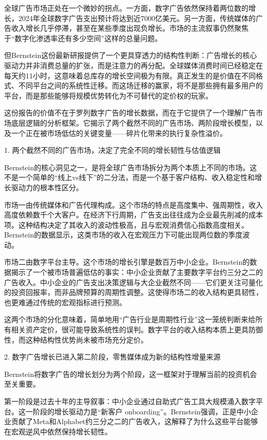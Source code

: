 \documentclass[11pt]{ctexart}
\begin{document}
全球广告市场正处在一个微妙的拐点。一方面，数字广告依然保持着两位数的增长，2024年全球数字广告支出预计将达到近7000亿美元。另一方面，传统媒体的广告收入增长几乎停滞，甚至在某些季度出现负增长。市场的主流叙事仍然聚焦于“数字化渗透率还有多少空间”这样的总量问题。

但Bernstein这份最新研报提供了一个更具穿透力的结构性判断：广告增长的核心驱动力并非消费总量的扩张，而是注意力的再分配。全球媒体消费时间已经稳定在每天约11小时，这意味着总库存的增长空间极为有限。真正发生的是价值在不同格式、不同平台之间的系统性迁移。而这场迁移的赢家，将不是那些拥有最多用户的平台，而是那些能够将规模优势转化为不可替代的定价权的玩家。

这份报告的价值不在于罗列数字广告的增长数据，而在于它提供了一个理解广告市场底层逻辑的分析框架。它揭示了两个截然不同的广告市场、两阶段增长模型，以及一个正在被市场低估的关键变量——碎片化带来的执行复杂性溢价。

1. 两个截然不同的广告市场，决定了完全不同的增长韧性与估值逻辑

Bernstein的核心洞见之一，是将全球广告市场拆分为两个本质上不同的市场。这不是一个简单的“线上vs线下”的二分法，而是一个基于客户结构、收入稳定性和增长驱动力的根本性区分。

市场一由传统媒体和广告代理构成。这个市场的特点是高度集中、强周期性，收入高度依赖数千个大客户。在经济下行周期，广告支出往往成为企业最先削减的成本项。这种结构决定了其收入的波动性极高，且与宏观消费信心指数高度相关。Bernstein的数据显示，这类市场的收入在宏观压力下可能出现两位数的季度波动。

市场二由数字平台主导。这个市场的增长引擎是数百万中小企业。Bernstein的数据揭示了一个被市场普遍低估的事实：中小企业贡献了主要数字平台约三分之二的广告收入。中小企业的广告支出决策逻辑与大企业截然不同——它们更关注可量化的投资回报率，而非品牌预算的周期性调整。这使得市场二的收入结构更具韧性，也更难通过传统的宏观指标进行预测。

这两个市场的分化意味着，简单地用“广告行业是周期性行业”这一笼统判断来给所有相关资产定价，很可能导致系统性的误判。数字平台的收入结构本质上更具防御性，而这种结构性优势尚未被市场充分定价。

2. 数字广告增长已进入第二阶段，零售媒体成为新的结构性增量来源

Bernstein将数字广告的增长划分为两个阶段，这一框架对于理解当前的投资机会至关重要。

第一阶段是过去十年的主导叙事：中小企业通过自助式广告工具大规模涌入数字平台。这一阶段的增长驱动力是“新客户 onboarding”。Bernstein强调，正是中小企业贡献了Meta和Alphabet约三分之二的广告收入，这解释了为什么这些平台能够在宏观逆风中依然保持增长韧性。
\end{document}

